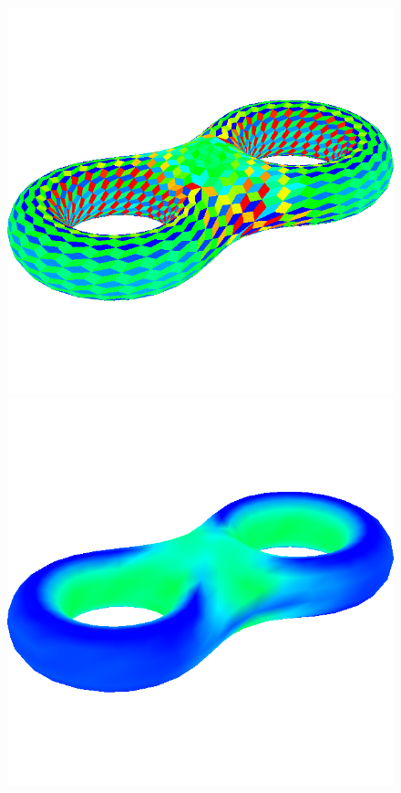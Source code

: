 \begin{figure}[!h]
    \includegraphics[scale=0.45]{images/eight-mce.png}
    \endminipage\hfill
    \centering
    \centering
    \includegraphics[scale=0.45]{images/eight-mcv.png}

\end{figure}
